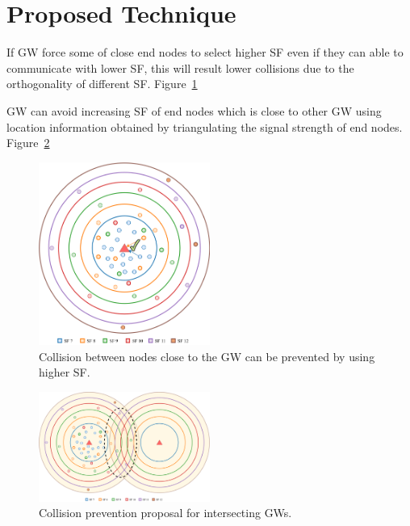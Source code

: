 \documentclass[conference]{IEEEtran}
\begin{document}
\section{Proposed Technique} \label{Proposed Technique}
\par [TODO]

\par If GW force some of close end nodes to select higher SF even if they can able to communicate with lower SF, this will result lower collisions due to the orthogonality of different SF. Figure~\ref{fig:collision_solution_single_gw}

\par GW can avoid increasing SF of end nodes which is close to other GW using location information obtained by triangulating the signal strength of end nodes. Figure~\ref{fig:collision_solution_multi_gw}

\begin{figure}
\centering
\includegraphics[width=0.5\textwidth]{collision_solution_single_gw}
\caption{Collision between nodes close to the GW can be prevented by using higher SF.}
\label{fig:collision_solution_single_gw}
\end{figure}

\begin{figure}
\centering
\includegraphics[width=0.5\textwidth]{collision_solution_multi_gw}
\caption{Collision prevention proposal for intersecting GWs.}
\label{fig:collision_solution_multi_gw}
\end{figure}
\end{document}
